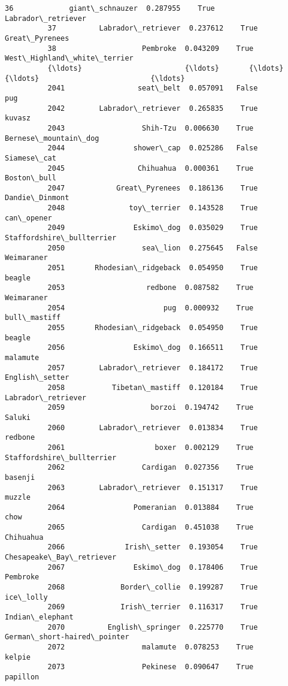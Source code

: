 \documentclass[11pt]{article}
\begin{document}
\begin{Verbatim}[commandchars=\\\{\}]
          36             giant\_schnauzer  0.287955    True           Labrador\_retriever   
          37          Labrador\_retriever  0.237612    True               Great\_Pyrenees   
          38                    Pembroke  0.043209    True  West\_Highland\_white\_terrier   
          {\ldots}                        {\ldots}       {\ldots}     {\ldots}                          {\ldots}   
          2041                 seat\_belt  0.057091   False                          pug   
          2042        Labrador\_retriever  0.265835    True                       kuvasz   
          2043                  Shih-Tzu  0.006630    True         Bernese\_mountain\_dog   
          2044                shower\_cap  0.025286   False                  Siamese\_cat   
          2045                 Chihuahua  0.000361    True                  Boston\_bull   
          2047            Great\_Pyrenees  0.186136    True               Dandie\_Dinmont   
          2048               toy\_terrier  0.143528    True                   can\_opener   
          2049                Eskimo\_dog  0.035029    True    Staffordshire\_bullterrier   
          2050                  sea\_lion  0.275645   False                   Weimaraner   
          2051       Rhodesian\_ridgeback  0.054950    True                       beagle   
          2053                   redbone  0.087582    True                   Weimaraner   
          2054                       pug  0.000932    True                 bull\_mastiff   
          2055       Rhodesian\_ridgeback  0.054950    True                       beagle   
          2056                Eskimo\_dog  0.166511    True                     malamute   
          2057        Labrador\_retriever  0.184172    True               English\_setter   
          2058           Tibetan\_mastiff  0.120184    True           Labrador\_retriever   
          2059                    borzoi  0.194742    True                       Saluki   
          2060        Labrador\_retriever  0.013834    True                      redbone   
          2061                     boxer  0.002129    True    Staffordshire\_bullterrier   
          2062                  Cardigan  0.027356    True                      basenji   
          2063        Labrador\_retriever  0.151317    True                       muzzle   
          2064                Pomeranian  0.013884    True                         chow   
          2065                  Cardigan  0.451038    True                    Chihuahua   
          2066              Irish\_setter  0.193054    True     Chesapeake\_Bay\_retriever   
          2067                Eskimo\_dog  0.178406    True                     Pembroke   
          2068             Border\_collie  0.199287    True                    ice\_lolly   
          2069             Irish\_terrier  0.116317    True              Indian\_elephant   
          2070          English\_springer  0.225770    True  German\_short-haired\_pointer   
          2072                  malamute  0.078253    True                       kelpie   
          2073                  Pekinese  0.090647    True                     papillon   
          

\end{Verbatim}
\end{document}
